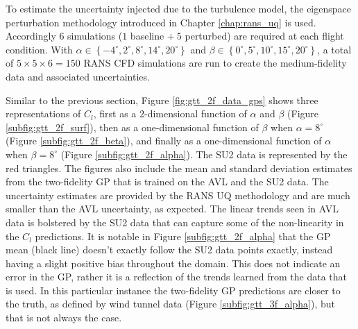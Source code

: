 To estimate the uncertainty injected due to the turbulence model, the eigenspace perturbation methodology introduced in Chapter \ref{chap:rans_uq} is used. 
Accordingly $6$ simulations ($1$ baseline $+~5$ perturbed) are required at each flight condition. 
With $\alpha \in \left \{ -4^\circ,2^\circ,8^\circ,14^\circ,20^\circ \right \}$ and $\beta \in \left \{ 0^\circ,5^\circ,10^\circ,15^\circ,20^\circ \right \}$, a total of $5\times5\times6 = 150$ RANS CFD simulations are run to create the medium-fidelity data and associated uncertainties. 

Similar to the previous section, Figure \ref{fig:gtt_2f_data_gps} shows three representations of $C_l$, first as a 2-dimensional function of $\alpha$ and $\beta$ (Figure \ref{subfig:gtt_2f_surf}), then as a one-dimensional function of $\beta$ when $\alpha=8^\circ$ (Figure \ref{subfig:gtt_2f_beta}), and finally as a one-dimensional function of $\alpha$ when $\beta = 8^\circ$ (Figure \ref{subfig:gtt_2f_alpha}).
The SU2 data is represented by the red triangles. 
The figures also include the mean and standard deviation estimates from the two-fidelity GP that is trained on the AVL and the SU2 data.
The uncertainty estimates are provided by the RANS UQ methodology and are much smaller than the AVL uncertainty, as expected. 
The linear trends seen in AVL data is bolstered by the SU2 data that can capture some of the non-linearity in the $C_l$ predictions. 
It is notable in Figure \ref{subfig:gtt_2f_alpha} that the GP mean (black line) doesn't exactly follow the SU2 data points exactly, instead having a slight positive bias throughout the domain.
This does not indicate an error in the GP, rather it is a reflection of the trends learned from the data that is used.
In this particular instance the two-fidelity GP predictions are closer to the truth, as defined by wind tunnel data (Figure \ref{subfig:gtt_3f_alpha}), but that is not always the case.


